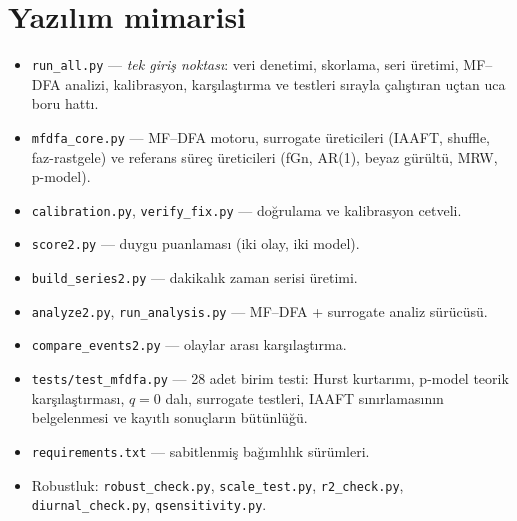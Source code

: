 \documentclass[11pt,a4paper]{article}
\begin{document}
\section{Yazılım mimarisi}
\label{app:yazilim}
\begin{itemize}[leftmargin=1.4em]
  \item \texttt{run\_all.py} --- \emph{tek giriş noktası}: veri denetimi,
        skorlama, seri üretimi, MF--DFA analizi, kalibrasyon, karşılaştırma ve
        testleri sırayla çalıştıran uçtan uca boru hattı.
  \item \texttt{mfdfa\_core.py} --- MF--DFA motoru, surrogate üreticileri
        (IAAFT, shuffle, faz-rastgele) ve referans süreç üreticileri
        (fGn, AR(1), beyaz gürültü, MRW, p-model).
  \item \texttt{calibration.py}, \texttt{verify\_fix.py} --- doğrulama ve
        kalibrasyon cetveli.
  \item \texttt{score2.py} --- duygu puanlaması (iki olay, iki model).
  \item \texttt{build\_series2.py} --- dakikalık zaman serisi üretimi.
  \item \texttt{analyze2.py}, \texttt{run\_analysis.py} --- MF--DFA + surrogate
        analiz sürücüsü.
  \item \texttt{compare\_events2.py} --- olaylar arası karşılaştırma.
  \item \texttt{tests/test\_mfdfa.py} --- 28 adet birim testi: Hurst kurtarımı,
        p-model teorik karşılaştırması, $q=0$ dalı, surrogate testleri,
        IAAFT sınırlamasının belgelenmesi ve kayıtlı sonuçların bütünlüğü.
  \item \texttt{requirements.txt} --- sabitlenmiş bağımlılık sürümleri.
  \item Robustluk: \texttt{robust\_check.py}, \texttt{scale\_test.py},
        \texttt{r2\_check.py}, \texttt{diurnal\_check.py}, \texttt{qsensitivity.py}.
\end{itemize}
\end{document}
